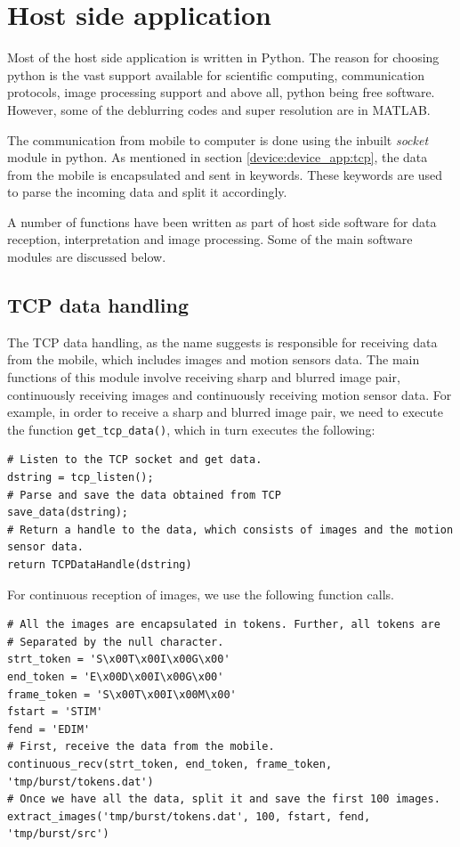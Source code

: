 \documentclass[BTech]{iitmdiss}
\begin{document}
\section{Host side application}
\label{device:host}
Most of the host side application is written in Python. The reason for 
choosing python is the vast support available for scientific computing,
communication protocols, image processing support and above all, python
being free software. However, some of the deblurring codes and 
super resolution are in MATLAB.

The communication from mobile to computer is done using the inbuilt
\emph{socket} module in python. As mentioned in section
\ref{device:device_app:tcp}, the data from the mobile is encapsulated and
sent in keywords. These keywords are used to parse the incoming
data and split it accordingly. 

A number of functions have been written as part of host side software
for data reception, interpretation and image processing. Some of the 
main software modules are discussed below.

\subsection{TCP data handling}
\label{device:host:tcp}
The TCP data handling, as the name suggests is responsible for receiving
data from the mobile, which includes images and motion sensors data. The
main functions of this module involve receiving sharp and blurred image 
pair, continuously receiving images and continuously receiving motion
sensor data. For example, in order to receive a sharp and blurred image
pair, we need to execute the function \verb|get_tcp_data()|, which
in turn executes the following:

\begin{singlespacing}
\begin{lstlisting}[style=pylisting]
# Listen to the TCP socket and get data.
dstring = tcp_listen();
# Parse and save the data obtained from TCP		
save_data(dstring);			
# Return a handle to the data, which consists of images and the motion sensor data.
return TCPDataHandle(dstring) 
\end{lstlisting}
\end{singlespacing}

For continuous reception of images, we use the following function 
calls.

\begin{singlespacing}
\begin{lstlisting}[style=pylisting]
# All the images are encapsulated in tokens. Further, all tokens are
# Separated by the null character.
strt_token = 'S\x00T\x00I\x00G\x00'
end_token = 'E\x00D\x00I\x00G\x00'
frame_token = 'S\x00T\x00I\x00M\x00'
fstart = 'STIM'
fend = 'EDIM'
# First, receive the data from the mobile.
continuous_recv(strt_token, end_token, frame_token, 'tmp/burst/tokens.dat')
# Once we have all the data, split it and save the first 100 images.
extract_images('tmp/burst/tokens.dat', 100, fstart, fend, 'tmp/burst/src')
\end{lstlisting}
\end{singlespacing}
\end{document}
